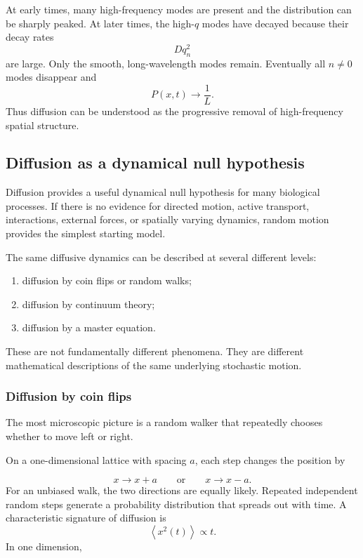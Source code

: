 At early times, many high-frequency modes are present and the
distribution can be sharply peaked.
At later times, the high-$q$ modes have decayed because their decay rates
% 
\[
    D q_n^2
\]
% 
are large. 
Only the smooth, long-wavelength modes remain.
Eventually all $n\neq0$ modes disappear and
% 
\[
    P(x,t) \longrightarrow \frac{1}{L}.
\]
% 
Thus diffusion can be understood as the progressive removal of
high-frequency spatial structure.


\subsection{Diffusion as a dynamical null hypothesis}

Diffusion provides a useful dynamical null hypothesis for many biological processes.
If there is no evidence for directed motion, active transport, interactions, external forces, or spatially varying dynamics, random motion provides the simplest starting model.

The same diffusive dynamics can be described at several different levels:

\begin{enumerate}
    \item diffusion by coin flips or random walks;
    \item diffusion by continuum theory;
    \item diffusion by a master equation.
\end{enumerate}
These are not fundamentally different phenomena.
They are different mathematical descriptions of the same underlying stochastic motion.


\subsubsection{Diffusion by coin flips}

The most microscopic picture is a random walker that repeatedly chooses whether to move left or right.

On a one-dimensional lattice with spacing $a$, each step changes the position by

\[ 
    x \rightarrow x+a \qquad \text{or} \qquad x \rightarrow x-a. 
\]
For an unbiased walk, the two directions are equally likely.
Repeated independent random steps generate a probability distribution that spreads out with time.
A characteristic signature of diffusion is
\[ 
    \left\langle x^2(t) \right\rangle \propto t. 
\]
In one dimension,

